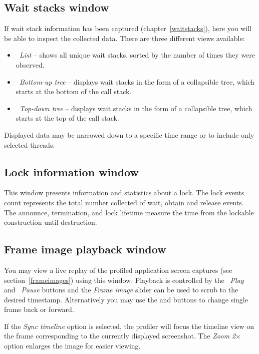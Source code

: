 \documentclass[hidelinks,titlepage,a4paper]{article}
\begin{document}
\subsection{Wait stacks window}
\label{waitstackswindow}

If wait stack information has been captured (chapter~\ref{waitstacks}), here you will be able to inspect the collected data. There are three different views available:

\begin{itemize}
\item \emph{\faTable{}~List} -- shows all unique wait stacks, sorted by the number of times they were observed.
\item \emph{\faTree{}~Bottom-up tree} -- displays wait stacks in the form of a collapsible tree, which starts at the bottom of the call stack.
\item \emph{\faTree{}~Top-down tree} -- displays wait stacks in the form of a collapsible tree, which starts at the top of the call stack.
\end{itemize}

Displayed data may be narrowed down to a specific time range or to include only selected threads.

\subsection{Lock information window}
\label{lockwindow}

This window presents information and statistics about a lock. The lock events count represents the total number collected of wait, obtain and release events. The announce, termination, and lock lifetime measure the time from the lockable construction until destruction.

\subsection{Frame image playback window}
\label{playback}

You may view a live replay of the profiled application screen captures (see section~\ref{frameimages}) using this window. Playback is controlled by the \emph{\faPlay~Play} and \emph{\faPause~Pause} buttons and the \emph{Frame image} slider can be used to scrub to the desired timestamp. Alternatively you may use the \emph{\faCaretLeft} and \emph{\faCaretRight} buttons to change single frame back or forward.

If the \emph{Sync timeline} option is selected, the profiler will focus the timeline view on the frame corresponding to the currently displayed screenshot. The \emph{Zoom 2$\times$} option enlarges the image for easier viewing.
\end{document}
